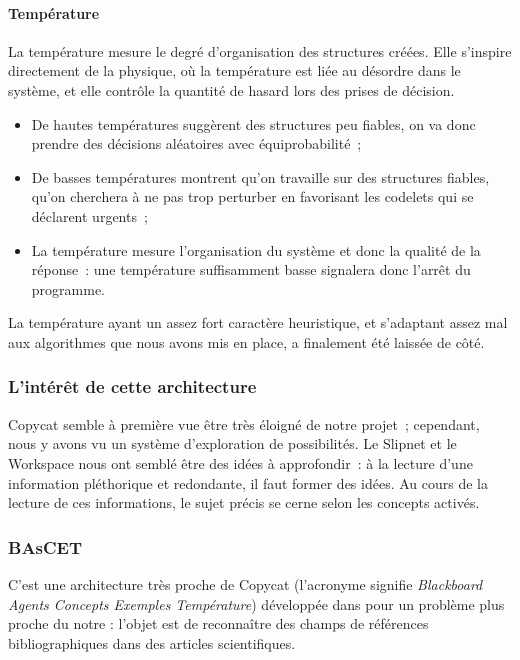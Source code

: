\documentclass[a4paper, 12pt]{article}
\begin{document}
\paragraph{Température}
La température mesure le degré d'organisation des structures créées. Elle s'inspire directement de la physique, où la température est liée au désordre dans le système, et elle contrôle la quantité de hasard lors des prises de décision.
\begin{itemize}
 \item De hautes températures suggèrent des structures peu fiables, on va donc prendre des décisions aléatoires avec équiprobabilité~;
 \item De basses températures montrent qu'on travaille sur des structures fiables, qu'on cherchera à ne pas trop perturber en favorisant les codelets qui se déclarent urgents~;
 \item La température mesure l'organisation du système et donc la qualité de la réponse~: une température suffisamment basse signalera donc l'arrêt du programme.
\end{itemize}

La température ayant un assez fort caractère heuristique, et s'adaptant assez mal aux algorithmes que nous avons mis en place, a finalement été laissée de côté.

\subsubsection{L'intérêt de cette architecture}

Copycat semble à première vue être très éloigné de notre projet~; cependant, nous y avons vu un système d'exploration de possibilités. Le Slipnet et le Workspace nous ont semblé être des idées à approfondir~: à la lecture d'une information pléthorique et redondante, il faut former des idées. Au cours de la lecture de ces informations, le sujet précis se cerne selon les concepts activés.

\subsubsection{BAsCET}

C'est une architecture très proche de Copycat (l'acronyme signifie \textit{Blackboard Agents Concepts Exemples Température}) développée dans \cite{parmentier_specification_1998} pour un problème plus proche du notre : l'objet est de reconnaître des champs de références bibliographiques dans des articles scientifiques.
\end{document}
